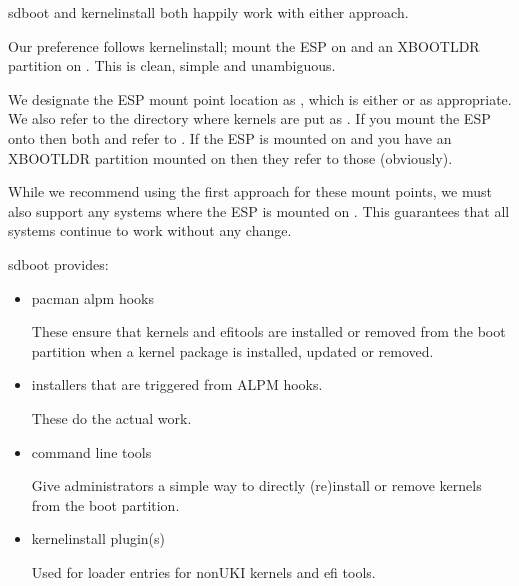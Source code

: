 \documentclass[letterpaper,11pt,english]{sphinxmanual}
\begin{document}
\sphinxAtStartPar
sd\sphinxhyphen{}boot and kernel\sphinxhyphen{}install both happily work with either approach.

\sphinxAtStartPar
Our preference follows kernel\sphinxhyphen{}install; mount the ESP on  and an
XBOOTLDR partition on . This is clean, simple and unambiguous.

\sphinxAtStartPar
We designate the ESP mount point location as , which is either  or  as
appropriate. We also refer to the directory where kernels are put as .
If you mount the ESP onto  then both  and  refer to .
If the ESP is mounted on  and you have an XBOOTLDR partition mounted on 
then they refer to those (obviously).

\sphinxAtStartPar
While we recommend using the first approach for these mount points, we must also support
any systems where the ESP is mounted on . This guarantees that all systems
continue to work without any change.

\sphinxAtStartPar
sd\sphinxhyphen{}boot provides:
\begin{itemize}
\item {} 
\sphinxAtStartPar
pacman alpm hooks

\sphinxAtStartPar
These ensure that kernels and efi\sphinxhyphen{}tools  are installed or removed from the boot partition when
a kernel package is installed, updated or removed.

\item {} 
\sphinxAtStartPar
installers that are triggered from ALPM hooks.

\sphinxAtStartPar
These do the actual work.

\item {} 
\sphinxAtStartPar
command line tools

\sphinxAtStartPar
Give administrators a simple way to directly (re\sphinxhyphen{})install or remove kernels from the boot partition.

\item {} 
\sphinxAtStartPar
kernel\sphinxhyphen{}install plugin(s)

\sphinxAtStartPar
Used for loader entries for non\sphinxhyphen{}UKI kernels and efi tools.

\end{itemize}
\end{document}
